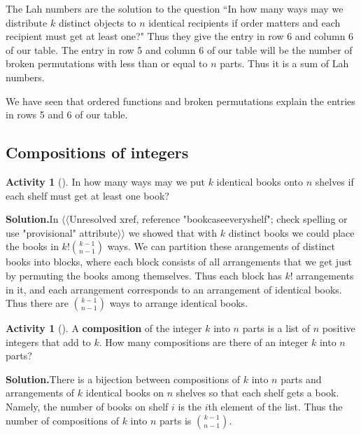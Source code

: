 \documentclass[10pt,]{book}
\newcommand{\terminology}[1]{\textbf{#1}}
\theoremstyle{plain}
\theoremstyle{definition}
\newtheorem{activity}[project]{Activity}
\numberwithin{equation}{chapter}
\begin{document}
\par
The Lah numbers are the solution to the question ``In how many ways may we distribute \(k\) distinct objects to \(n\) identical recipients if order matters and each recipient must get at least one?" Thus they give the entry in row 6 and column 6 of our table. The entry in row 5 and column 6 of our table will be the number of broken permutations with less than or equal to \(n\) parts. Thus it is a sum of Lah numbers.%
\par
We have seen that ordered functions and broken permutations explain the entries in rows 5 and 6 of our table.%
\typeout{************************************************}
\typeout{************************************************}
\subsection[{Compositions of integers}]{Compositions of integers}\label{subsection-25}
\begin{activity}[]\label{activity-61}
In how many ways may we put \(k\) identical books onto \(n\) shelves if each shelf must get at least one book?%
\par\medskip\noindent%
\textbf{Solution.}\quad In {$\langle\langle$Unresolved xref, reference "bookcaseeveryshelf"; check spelling or use "provisional" attribute$\rangle\rangle$} we showed that with \(k\) distinct books we could place the books in \(k!{k-1\choose n-1}\) ways. We can partition these arangements of distinct books into blocks, where each block consists of all arrangements that we get just by permuting the books among themselves. Thus each block has \(k!\) arrangements in it, and each arrangement corresponds to an arrangement of identical books. Thus there are \(k-1\choose n-1\) ways to arrange identical books.%
\end{activity}
\begin{activity}[]\label{compositionagian}
A \terminology{composition} of the integer \(k\) into \(n\) parts is a list of \(n\) positive integers that add to \(k\).  How many compositions are there of an integer \(k\) into \(n\) parts?%
\par\medskip\noindent%
\textbf{Solution.}\quad There is a bijection between compositions of \(k\) into \(n\) parts and arrangements of \(k\) identical books on \(n\) shelves so that each shelf gets a book. Namely, the number of books on shelf \(i\) is the \(i\)th element of the list. Thus the number of compositions of \(k\) into \(n\) parts is \(k-1 \choose n-1\).%
\end{activity}
\end{document}
